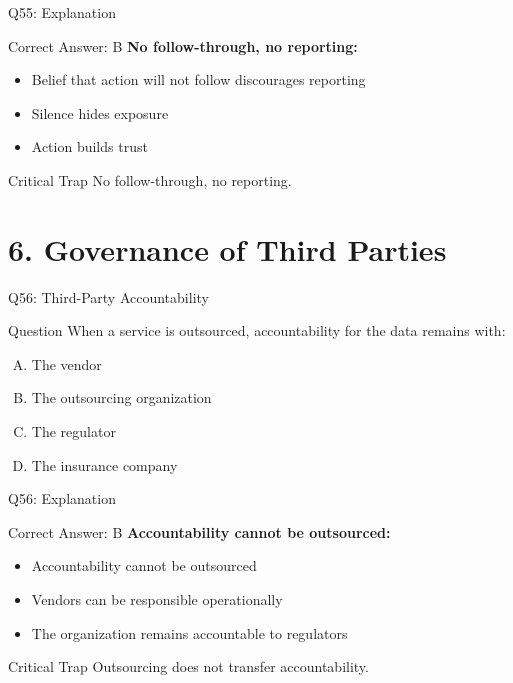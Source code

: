 \documentclass{beamer}
\begin{document}
	\begin{frame}{Q55: Explanation}
		\begin{block}{Correct Answer: B}
			\textbf{No follow-through, no reporting:}
			\begin{itemize}
				\item Belief that action will not follow discourages reporting
				\item Silence hides exposure
				\item Action builds trust
			\end{itemize}
		\end{block}
		\begin{alertblock}{Critical Trap}
			No follow-through, no reporting.
		\end{alertblock}
	\end{frame}
	
	\section{6. Governance of Third Parties}
	
	\begin{frame}{Q56: Third-Party Accountability}
		\begin{block}{Question}
			When a service is outsourced, accountability for the data remains with:
		\end{block}
		\begin{enumerate}[(A)]
			\item The vendor
			\item The outsourcing organization
			\item The regulator
			\item The insurance company
		\end{enumerate}
	\end{frame}
	
	\begin{frame}{Q56: Explanation}
		\begin{block}{Correct Answer: B}
			\textbf{Accountability cannot be outsourced:}
			\begin{itemize}
				\item Accountability cannot be outsourced
				\item Vendors can be responsible operationally
				\item The organization remains accountable to regulators
			\end{itemize}
		\end{block}
		\begin{alertblock}{Critical Trap}
			Outsourcing does not transfer accountability.
		\end{alertblock}
	\end{frame}
	
\end{document}
